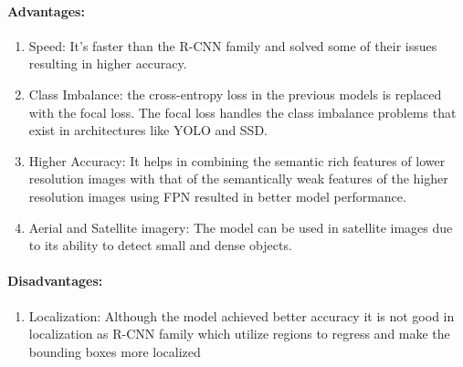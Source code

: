 \documentclass[12pt]{article}
\begin{document}
\paragraph{Advantages:}
\begin{enumerate}[leftmargin=1cm, labelwidth=4cm]
  \item Speed: It's faster than the R-CNN family and solved some of their issues resulting in higher accuracy. 
  \item Class Imbalance:  the cross-entropy loss in the previous models is replaced with the focal loss. The focal loss handles the class imbalance problems that exist in architectures like YOLO and SSD.
  \item Higher Accuracy:  It helps in combining the semantic rich features of lower resolution images with that of the semantically weak features of the higher resolution images using FPN resulted in better model performance.
  \item Aerial and Satellite imagery: The model can be used in satellite images due to its ability to detect small and dense objects.
\end{enumerate}

\paragraph{Disadvantages:}
\begin{enumerate}[leftmargin=1cm, labelwidth=4cm]
  \item Localization: Although the model achieved better accuracy it is not good in localization as R-CNN family which utilize regions to regress and make the bounding boxes more localized

\end{enumerate}
\end{document}
